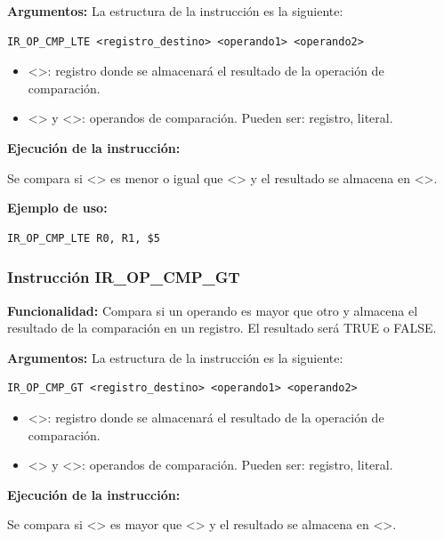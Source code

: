 \noindent
\textbf{Argumentos:} La estructura de la instrucción es la siguiente:
\begin{verbatim}
IR_OP_CMP_LTE <registro_destino> <operando1> <operando2>
\end{verbatim}
\begin{itemize}
    \item <>: registro donde se almacenará el resultado de la operación de comparación.
    \item <> y <>: operandos de comparación. Pueden ser: registro, literal.
\end{itemize}

\noindent
\textbf{Ejecución de la instrucción:}
\vspace{0.3cm}

\noindent
Se compara si <> es menor o igual que <> y el resultado se almacena en <>.
\vspace{0.3cm}

\noindent
\textbf{Ejemplo de uso:}
\begin{verbatim}
IR_OP_CMP_LTE R0, R1, $5
\end{verbatim}

\subsubsection{Instrucción IR\_OP\_CMP\_GT}\label{subsubsec:IR_OP_CMP_GT}
\noindent
\textbf{Funcionalidad:} Compara si un operando es mayor que otro y almacena el resultado de la comparación en un registro. El resultado será TRUE o FALSE.

\noindent
\textbf{Argumentos:} La estructura de la instrucción es la siguiente:
\begin{verbatim}
IR_OP_CMP_GT <registro_destino> <operando1> <operando2>
\end{verbatim}
\begin{itemize}
    \item <>: registro donde se almacenará el resultado de la operación de comparación.
    \item <> y <>: operandos de comparación. Pueden ser: registro, literal.
\end{itemize}

\noindent
\textbf{Ejecución de la instrucción:}
\vspace{0.3cm}

\noindent
Se compara si <> es mayor que <> y el resultado se almacena en <>.
\vspace{0.3cm}

